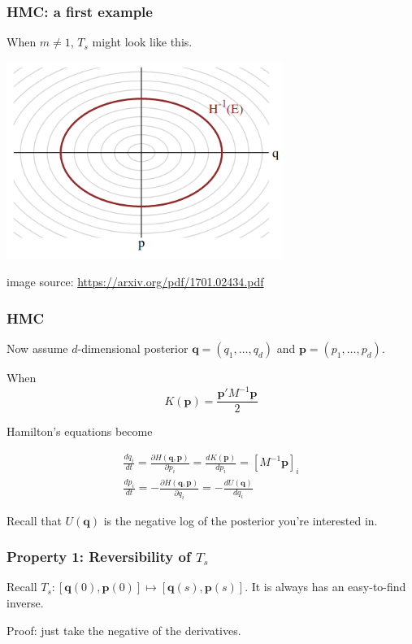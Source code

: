 \documentclass{beamer}
\begin{document}
\begin{frame}
\frametitle{HMC: a first example}

When $m \neq 1$, $T_s$ might look like this. 
\begin{center}
\includegraphics[width=90mm]{level_sets.png}
\end{center}
image source: \url{https://arxiv.org/pdf/1701.02434.pdf}

\end{frame}

\begin{frame}
\frametitle{HMC}

Now assume $d$-dimensional posterior $\mathbf{q} = (q_1, \ldots, q_d)$ and $\mathbf{p} = (p_1, \ldots, p_d)$.
\newline

When
$$
K(\mathbf{p}) = \frac{\mathbf{p}'M^{-1}\mathbf{p}}{2} 
$$

Hamilton's equations become

\begin{gather}
\frac{dq_i}{dt} = \frac{\partial H(\mathbf{q},\mathbf{p})}{\partial p_i} =  \frac{d K(\mathbf{p}) }{d p_i} = [M^{-1}\mathbf{p}]_i  \\
\frac{dp_i}{dt} = -\frac{\partial H(\mathbf{q},\mathbf{p})}{\partial q_i} = -\frac{d U(\mathbf{q})}{d q_i} 
\end{gather}

Recall that $U(\mathbf{q})$ is the negative log of the posterior you're interested in.
\end{frame}


\begin{frame}
\frametitle{Property 1: Reversibility of $T_s$}

Recall  $T_s: [\mathbf{q}(0), \mathbf{p}(0)] \mapsto [\mathbf{q}(s), \mathbf{p}(s)]$. It is always has an easy-to-find inverse.
\newline

Proof: just take the negative of the derivatives.


\end{frame}
\end{document}
